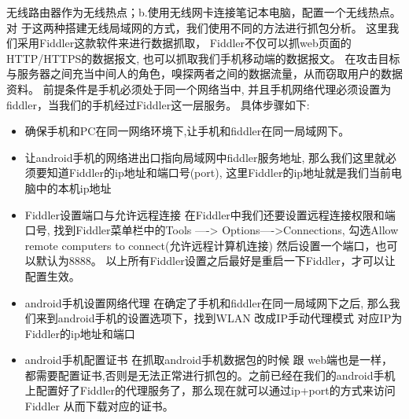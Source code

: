 无线路由器作为无线热点；b.使用无线网卡连接笔记本电脑，配置一个无线热点。对
于这两种搭建无线局域网的方式，我们使用不同的方法进行抓包分析。
这里我们采用Fiddler这款软件来进行数据抓取， Fiddler不仅可以抓web页面的HTTP/HTTPS的数据报文, 也可以抓取我们手机移动端的数据报文。
在攻击目标与服务器之间充当中间人的角色，嗅探两者之间的数据流量，从而窃取用户的数据资料。
前提条件是手机必须处于同一个网络当中, 并且手机网络代理必须设置为fiddler，当我们的手机经过Fiddler这一层服务。
具体步骤如下:
\begin{itemize}
    \item 确保手机和PC在同一网络环境下,让手机和fiddler在同一局域网下。
    \item 让android手机的网络进出口指向局域网中fiddler服务地址, 那么我们这里就必须要知道Fiddler的ip地址和端口号(port), 这里Fiddler的ip地址就是我们当前电脑中的本机ip地址
    \item Fiddler设置端口与允许远程连接 在Fiddler中我们还要设置远程连接权限和端口号, 找到Fiddler菜单栏中的Tools ----> Options---->Connections, 勾选Allow remote computers to connect(允许远程计算机连接) 然后设置一个端口，也可以默认为8888。 以上所有Fiddler设置之后最好是重启一下Fiddler，才可以让配置生效。
    \item android手机设置网络代理 在确定了手机和fiddler在同一局域网下之后, 那么我们来到android手机的设置选项下，找到WLAN 改成IP手动代理模式 对应IP为Fiddler的ip地址和端口
    \item android手机配置证书 在抓取android手机数据包的时候 跟 web端也是一样，都需要配置证书,否则是无法正常进行抓包的。之前已经在我们的android手机上配置好了Fiddler的代理服务了，那么现在就可以通过ip+port的方式来访问Fiddler 从而下载对应的证书。
\end{itemize}

